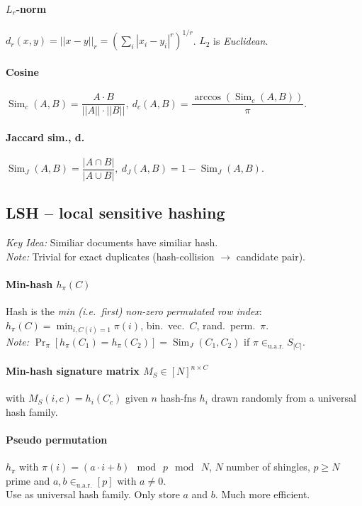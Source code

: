 \documentclass[a4paper, 9pt, DIV=24]{scrartcl}
\DeclareMathOperator{\Sim}{Sim}
\newcommand{\inuar}{\in_{\text{u.a.r.}}}
\begin{document}
\begin{twocolumn}
\paragraph{$L_r$-norm}
$d_r(x,y) = ||x-y||_r = (\sum_i |x_i - y_i|^r)^{1/r}$. $L_2$ is \emph{Euclidean}.
\paragraph{Cosine}
$\Sim_c(A,B) = \dfrac{A \cdot B}{||A||\cdot||B||},\ d_c(A,B) = \dfrac{\arccos(\Sim_c(A,B))}{\pi}.$
\paragraph{Jaccard sim., d.}
$\Sim_J(A,B) = \dfrac{|A \cap B|}{|A \cup B|},\ d_J(A,B) = 1 - \Sim_J(A,B).$

\subsection{LSH -- local sensitive hashing}
\emph{Key Idea:} Similiar documents have similiar hash. \\
\emph{Note:} Trivial for exact duplicates (hash-collision $\rightarrow$ candidate pair).
\paragraph{Min-hash $h_\pi(C)$}
Hash is the \emph{min (i.e.\ first) non-zero permutated row index}: $h_\pi(C) = \min_{i, C(i) = 1} \pi(i)$,
bin.\ vec.\ $C$, rand.\ perm.\ $\pi$. \\
\emph{Note:} $\Pr_\pi[h_\pi(C_1) = h_\pi(C_2)] = \Sim_J(C_1,C_2)$ if $\pi \inuar S_{|C|}$.
\paragraph{Min-hash signature matrix $M_S \in [N]^{n\times C}$}
with $M_S(i,c) = h_i(C_c)$
given $n$ hash-fns $h_i$ drawn randomly from a universal hash family.

\paragraph{Pseudo permutation}
$h_\pi$ with $\pi(i) = (a\cdot i + b) \mod\ p \mod\ N$, $N$ number of shingles, $p\geq N$ prime and $a,b \inuar [p]$ with $a \neq 0$. \\
Use as universal hash family. Only store $a$ and $b$. Much more efficient.


\end{twocolumn}
\end{document}
